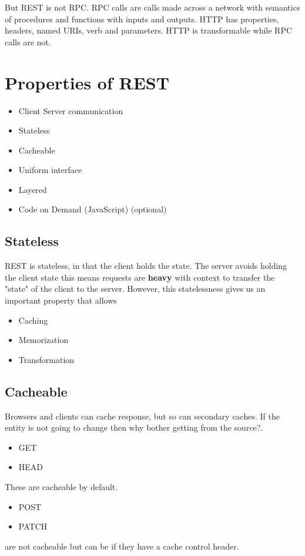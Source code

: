 \documentclass[../CMPUT-404-Notes.tex]{subfiles}
\begin{document}
But REST is not RPC.
RPC calls are calls made across a network with semantics of procedures and functions with inputs and outputs.
HTTP has properties, headers, named URIs, verb and parameters. HTTP is transformable while RPC calls are not.

\section{Properties of REST}
\begin{itemize}
  \item Client Server communication
  \item Stateless
  \item Cacheable
  \item Uniform interface
  \item Layered
  \item Code on Demand (JavaScript) (optional)
\end{itemize}


\subsection{Stateless}
REST is stateless, in that the client holds the state. The server avoids holding the client state this means requests are \textbf{heavy} with context to transfer the "state" of the client to the server.
However, this statelessness gives us an important property that allows 
\begin{itemize}
  \item Caching
  \item Memorization
  \item Transformation
\end{itemize}

\subsection{Cacheable}
Browsers and clients can cache response, but so can secondary caches. If the entity is not going to change then why bother getting from the source?.
\begin{itemize}
  \item GET
  \item HEAD
\end{itemize}
These are cacheable by default.
\begin{itemize}
  \item POST
  \item PATCH
\end{itemize}
are not cacheable but can be if they have a cache control header.
\end{document}
